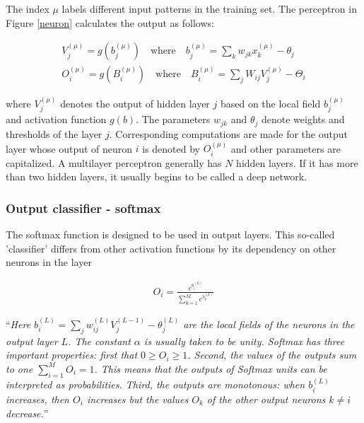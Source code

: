 The index $ \mu $ labels different input patterns in the training set. The perceptron in Figure \ref{neuron} calculates the output as follows: \cite{mehlig}

\begin{gather}
V_j^{(\mu)} = g(b_j^{(\mu)}) \quad \text{where} \quad b_j^{(\mu)} = \sum_{k} w_{jk} x_{k}^{(\mu)} - \theta_{j} \\
O_i^{(\mu)} = g(B_i^{(\mu)}) \quad \text{where} \quad B_i^{(\mu)} = \sum_{j} W_{ij} V_{j}^{(\mu)} - \Theta_{i} 
\end{gather}

\noindent where $ V_j^{(\mu)} $ denotes the output of hidden layer $ j $ based on the local field $ b_j^{(\mu)} $ and activation function $ g(b) $. The parameters $ w_{jk} $ and $ \theta_{j} $ denote weights and thresholds of the layer $ j $. Corresponding computations are made for the output layer whose output of neuron $ i $ is denoted by $ O_i^{(\mu)} $ and other parameters are capitalized. \cite{mehlig} A multilayer perceptron generally has $ N $ hidden layers. If it has more than two hidden layers, it usually begins to be called a deep network. 

\subsubsection{Output classifier - softmax}

The softmax function is designed to be used in output layers. This so-called 'classifier' differs from other activation functions by its dependency on other neurons in the layer \cite{mehlig}

\begin{gather}
O_{i} = \frac{e^{b_i^{(L)}}}{\sum_{k=1}^{M} e^{b_k^{(L)}}}
\end{gather}

\enquote{\textit{Here $ b_{i}^{(L)} = \sum_{j}w_{ij}^{(L)} V_{j}^{(L-1)} - \theta _{j}^{(L)} $  are the local fields of the neurons in the output layer $ L $. The constant $\alpha$ is usually taken to be unity. Softmax has three important properties: first that $ 0 \geq O_i \geq 1 $. Second, the values of the outputs sum to one $ \sum_{i=1}^{M} O_i = 1 $. This means that the outputs of Softmax units can be interpreted as probabilities. Third, the outputs are monotonous: when $ b_i^{(L)} $ increases, then $ O_i $ increases but the values $ O_k $ of the other output neurons $ k \neq i $ decrease.}} \cite{mehlig}

